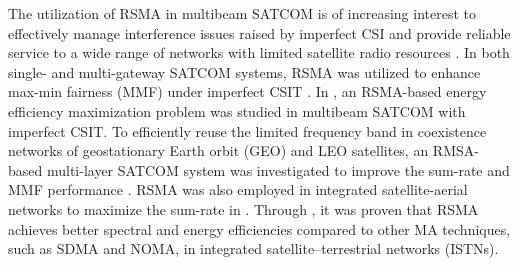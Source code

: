 \documentclass[draftclsnofoot, onecolumn, comsoc, 12pt]{IEEEtran}
\begin{document}
The utilization of RSMA in multibeam SATCOM is of increasing interest to effectively manage interference issues raised by imperfect CSI and provide reliable service to a wide range of networks with limited satellite radio resources \cite{yin2020rate, yin2020rate_J, yin2021ratephy, si2022rate, liu2023energy, khan2023rate, xu2023distributed, lin2021supporting, lin2020secure, yin2022rate, 10266774, kim2023distributed}.
{In both single- and multi-gateway SATCOM systems, RSMA was utilized to enhance max-min fairness (MMF) under imperfect CSIT \cite{yin2020rate, yin2020rate_J, yin2021ratephy, si2022rate}.}
{In \cite{liu2023energy}, an RSMA-based energy efficiency maximization problem was studied in multibeam SATCOM with imperfect CSIT.}
{To efficiently reuse the limited frequency band in coexistence networks of geostationary Earth orbit (GEO) and LEO satellites, an RMSA-based multi-layer SATCOM system was investigated to improve the sum-rate and MMF performance \cite{khan2023rate, xu2023distributed}.}
{RSMA was also employed in integrated satellite-aerial networks to maximize the sum-rate in \cite{lin2021supporting}.
Through \cite{lin2020secure, yin2022rate, 10266774, kim2023distributed}, it was proven that RSMA achieves better spectral and energy efficiencies compared to other MA techniques, such as SDMA and NOMA, in integrated satellite–terrestrial networks (ISTNs).}


%

\end{document}
